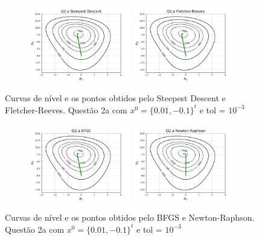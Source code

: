 \documentclass[10pt, a4paper]{article}
\begin{document}
\begin{figure}[H]
  \centering
  \begin{subfigure}[b]{\textwidth}
    \includegraphics[width=0.49\textwidth]{figuras/Q2.a_Steepest Descent_P0=[0.01e-0.1].pdf}
    \includegraphics[width=0.49\textwidth]{figuras/Q2.a_Fletcher-Reeves_P0=[0.01e-0.1].pdf}
  \end{subfigure}
  \caption{Curvas de nível e os pontos obtidos pelo Steepest Descent e Fletcher-Reeves. Questão 2a com $x^0 = \{0.01,-0.1\}^t$ e tol = $10^{-3}$}
\end{figure}

\begin{figure}[H]
  \centering
  \begin{subfigure}[b]{\textwidth}
    \includegraphics[width=0.49\textwidth]{figuras/Q2.a_BFGS_P0=[0.01e-0.1].pdf}
    \includegraphics[width=0.49\textwidth]{figuras/Q2.a_Newton Raphson_P0=[0.01e-0.1].pdf}
  \end{subfigure}
  \caption{Curvas de nível e os pontos obtidos pelo BFGS e Newton-Raphson. Questão 2a com $x^0 = \{0.01,-0.1\}^t$ e tol = $10^{-3}$}
\end{figure}
\end{document}
